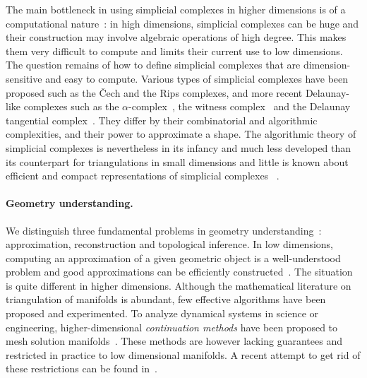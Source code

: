 The main bottleneck in using simplicial complexes in higher dimensions is of a computational nature~:  in high dimensions, simplicial complexes can be huge and their construction may  involve algebraic operations of high degree. This makes  them very difficult to compute and limits their current use to low dimensions.
The question remains of how to define simplicial complexes that are dimension-sensitive and easy to compute.  Various types of simplicial complexes have been proposed such as the \v{C}ech and the Rips complexes, and more recent Delaunay-like complexes such as the $\alpha$-complex~\cite{eks-sspp-83,he-ubds-95}, the witness complex~\cite{deSilva2008,cds-tewc-2004} and the Delaunay tangential complex~\cite{geometrica-7142i}. They differ by their combinatorial and algorithmic complexities, and their power to approximate a shape.  The algorithmic theory of simplicial complexes is nevertheless in its infancy and much less developed than its counterpart for triangulations in small dimensions%
and little is known about efficient and compact representations of simplicial complexes%
~\cite{Attali2011}.  


\paragraph{Geometry understanding.}
We distinguish three fundamental problems in geometry understanding~: approximation, reconstruction and topological inference.
In low dimensions, computing an approximation of a given geometric object is a well-understood problem and good approximations can be efficiently constructed~\cite{geometrica-bcmrv-ms-06,he-gtmg-2001}.  The situation is quite different in higher dimensions.  Although the mathematical literature on triangulation of manifolds is abundant, few effective algorithms have been proposed and experimented. 
To analyze {dynamical systems} in science or engineering, higher-dimensional {\em continuation methods} have been proposed to mesh solution manifolds~\cite{mh-mpc-2002}. These methods are however lacking guarantees and restricted in practice to low dimensional manifolds. A recent attempt to get rid of these restrictions can be found in~\cite{}.


